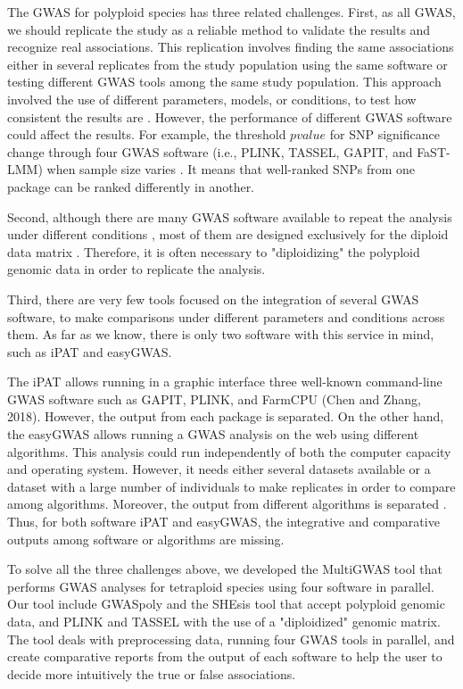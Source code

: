 \documentclass{article}
\begin{document}
The GWAS for polyploid species has three related challenges. First, as all GWAS, we should replicate the study as a reliable method to validate the results and recognize real associations. This replication involves finding the same associations either in several replicates from the study population using the same software or testing different GWAS tools among the same study population. This approach involved the use of different parameters, models, or conditions, to test how consistent the results are \cite{De2014,Pearson2008}. However, the performance of different GWAS software could affect the results. For example,  the threshold $pvalue$ for SNP significance change through four GWAS software (i.e., PLINK, TASSEL, GAPIT, and FaST-LMM) when sample size varies \cite{Yan2019}. It means that well-ranked SNPs from one package can be ranked differently in another.

Second, although there are many GWAS software available to repeat the analysis under different conditions \cite{Gumpinger2018}, most of them are designed exclusively for the diploid data matrix \cite{Bourke2018}. Therefore, it is often necessary to "diploidizing" the polyploid genomic data in order to replicate the analysis. 

Third, there are very few tools focused on the integration of several GWAS software, to make comparisons under different parameters and conditions across them. As far as we know, there is only two software with this service in mind, such as iPAT and easyGWAS. 

The iPAT allows running in a graphic interface three well-known command-line GWAS software such as GAPIT, PLINK, and FarmCPU (Chen and Zhang, 2018). However, the output from each package is separated. On the other hand, the easyGWAS allows running a GWAS analysis on the web using different algorithms. This analysis could run independently of both the computer capacity and operating system. However, it needs either several datasets available or a dataset with a large number of individuals to make replicates in order to compare among algorithms. Moreover, the output from different algorithms is separated \cite{Grimm2017}.  Thus, for both software iPAT and easyGWAS, the integrative and comparative outputs among software or algorithms are missing. 

To solve all the three challenges above, we developed the MultiGWAS tool that performs GWAS analyses for tetraploid species using four software in parallel. Our tool include GWASpoly \cite{Rosyara2016} and the SHEsis tool \cite{Shen2016} that accept polyploid genomic data, and PLINK \cite{Purcell2007} and TASSEL \cite{Bradbury2007} with the use of a "diploidized" genomic matrix. The tool deals with preprocessing data, running four GWAS tools in parallel, and create comparative reports from the output of each software to help the user to decide more intuitively the true or false associations.
\end{document}
